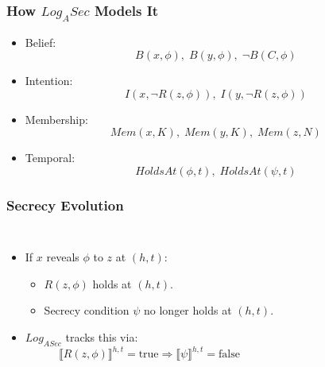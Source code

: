 \documentclass[aspectratio=169]{beamer}
\begin{document}
\begin{frame}
\frametitle{How $Log_ASec$ Models It}
\begin{itemize}
    \Large 
    \item Belief:
    \[
    B(x, \phi), \; B(y, \phi), \; \neg B(C, \phi)
    \]
    \item Intention:
    \[
    I(x, \neg R(z, \phi)), \; I(y, \neg R(z, \phi))
    \]
    \item Membership:
    \[
    Mem(x, K), \; Mem(y, K), \; Mem(z, N)
    \]
    \item Temporal:
    \[
    HoldsAt(\phi, t), \; HoldsAt(\psi, t)
    \]
\end{itemize}
\end{frame}

\begin{frame}
\frametitle{Secrecy Evolution}

\begin{columns}[c]


\Large
\begin{itemize}
    \item If $x$ reveals $\phi$ to $z$ at $(h,t)$:
    \begin{itemize}
        \item $R(z, \phi)$ holds at $(h,t)$.
        \item Secrecy condition $\psi$ no longer holds at $(h,t)$.
    \end{itemize}
    \item $Log_{ASec}$ tracks this via:
    \[
    \llbracket R(z, \phi) \rrbracket^{h,t} = \text{true}
    \Longrightarrow 
    \llbracket \psi \rrbracket^{h,t} = \text{false}
    \]
\end{itemize}



\end{columns}
\end{frame}
\end{document}
